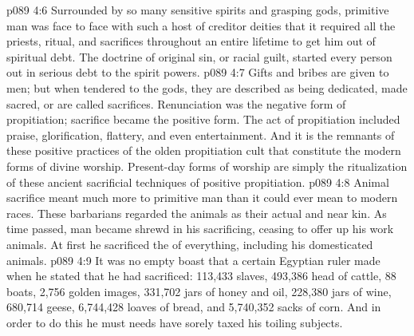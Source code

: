 \vs p089 4:6 Surrounded by so many sensitive spirits and grasping gods, primitive man was face to face with such a host of creditor deities that it required all the priests, ritual, and sacrifices throughout an entire lifetime to get him out of spiritual debt. The doctrine of original sin, or racial guilt, started every person out in serious debt to the spirit powers.
\vs p089 4:7 \pc Gifts and bribes are given to men; but when tendered to the gods, they are described as being dedicated, made sacred, or are called sacrifices. Renunciation was the negative form of propitiation; sacrifice became the positive form. The act of propitiation included praise, glorification, flattery, and even entertainment. And it is the remnants of these positive practices of the olden propitiation cult that constitute the modern forms of divine worship. Present\hyp{}day forms of worship are simply the ritualization of these ancient sacrificial techniques of positive propitiation.
\vs p089 4:8 \pc Animal sacrifice meant much more to primitive man than it could ever mean to modern races. These barbarians regarded the animals as their actual and near kin. As time passed, man became shrewd in his sacrificing, ceasing to offer up his work animals. At first he sacrificed the  of everything, including his domesticated animals.
\vs p089 4:9 It was no empty boast that a certain Egyptian ruler made when he stated that he had sacrificed: 113,433 slaves, 493,386 head of cattle, 88 boats, 2,756 golden images, 331,702 jars of honey and oil, 228,380 jars of wine, 680,714 geese, 6,744,428 loaves of bread, and 5,740,352 sacks of corn. And in order to do this he must needs have sorely taxed his toiling subjects.
